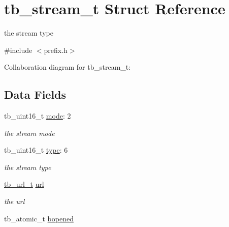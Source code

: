 \hypertarget{structtb__stream__t}{\section{tb\-\_\-stream\-\_\-t Struct Reference}
\label{structtb__stream__t}
}


the stream type  




{\ttfamily \#include $<$prefix.\-h$>$}



Collaboration diagram for tb\-\_\-stream\-\_\-t\-:
\subsection*{Data Fields}
\begin{DoxyCompactItemize}
\item 
\hypertarget{structtb__stream__t_a7e298b893e7145a0ee220f4f1627251d}{tb\-\_\-uint16\-\_\-t \hyperlink{structtb__stream__t_a7e298b893e7145a0ee220f4f1627251d}{mode}\-: 2}\label{structtb__stream__t_a7e298b893e7145a0ee220f4f1627251d}

\begin{DoxyCompactList}\small\item\em the stream mode \end{DoxyCompactList}\item 
\hypertarget{structtb__stream__t_a4db902250eb14867ccb664b47a55cdb1}{tb\-\_\-uint16\-\_\-t \hyperlink{structtb__stream__t_a4db902250eb14867ccb664b47a55cdb1}{type}\-: 6}\label{structtb__stream__t_a4db902250eb14867ccb664b47a55cdb1}

\begin{DoxyCompactList}\small\item\em the stream type \end{DoxyCompactList}\item 
\hypertarget{structtb__stream__t_a9211072746e253ec601c8358acd5e332}{\hyperlink{structtb__url__t}{tb\-\_\-url\-\_\-t} \hyperlink{structtb__stream__t_a9211072746e253ec601c8358acd5e332}{url}}\label{structtb__stream__t_a9211072746e253ec601c8358acd5e332}

\begin{DoxyCompactList}\small\item\em the url \end{DoxyCompactList}\item 
\hypertarget{structtb__stream__t_a40593f5c9c8ff48cb8aa17d77072a327}{tb\-\_\-atomic\-\_\-t \hyperlink{structtb__stream__t_a40593f5c9c8ff48cb8aa17d77072a327}{bopened}}\label{structtb__stream__t_a40593f5c9c8ff48cb8aa17d77072a327}


\end{DoxyCompactItemize}
